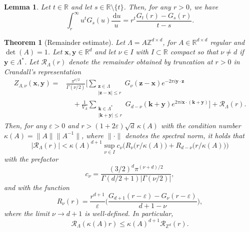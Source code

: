 \documentclass[10pt,a4paper]{amsart}
\newtheorem{lemma}{Lemma}
\newtheorem{theorem}{Theorem}
\renewcommand{\d}{\,\mathrm{d}}
\newcommand{\new}[1]{#1}
\newcommand{\zeps}[3]{\new{Z_{#1} (#2, #3)}}
\begin{document}
\begin{lemma}
\label{lem:g-int-revisited}
Let $t \in \mathds{R}$ and let $s \in \mathds{R} \setminus \{t\}$. Then, for any $r > 0$, we have
\[\int_r^\infty u^{t}G_s(u)\frac{\d u}{u} = r^{t} \frac{G_{t}(r) - G_s(r)}{t-s}.\]
\end{lemma}

\begin{theorem}[Remainder estimate]
  \label{theorem:trunc}
Let $\Lambda=A\mathds Z^{d\times d}$, for $A\in\mathds R^{d\times d}$ regular and $\det(A)=1$. Let $\bm x, \bm y \in \mathds{R}^d$ and let
$\nu\in I$ with $I\subset\mathds R$ compact so that $\nu\neq d$ if $\bm y\in\Lambda^*$.
Let $\mathcal{R}_{\Lambda}(r)$ denote the remainder obtained by truncation at $r>0$ in Crandall's representation
\begin{align*}
\zeps{\Lambda,\nu}{\bm{x}}{\bm{y}}
=&\frac{\pi ^{\nu/2}}{\Gamma(\nu/2)}\Bigg[\sum_{\substack{\bm z\in\Lambda\\ |\bm z - \bm x|\le r}}
G_{\nu}(\bm{z} -\bm x)e^{-2\pi i\bm{y}\cdot\bm{z}}
\\
&
\quad
+\frac{1}{V_{\Lambda}}
\sum_{\substack{\bm k\in\Lambda^{\ast}\\ |\bm k + \bm y|\le r}}G_{d-\nu}
(\bm{k} + \bm y) e^{2\pi i\bm{x}\cdot (\bm{k} + \bm y)}
\Bigg]+\mathcal R_\Lambda(r).
\end{align*}
Then, for any $\varepsilon>0$ and $r>(1+2\varepsilon)\sqrt{d}\,\kappa(A)$ with the condition number $\kappa(A)=\|A\|\|A^{-1}\|$, where $\|\cdot\|$ denotes the spectral norm,
it holds that
$$
|\mathcal R_\Lambda(r)|<\kappa(A)^{d+1} \sup_{\nu \in I}
c_\nu
\Big(
R_{\nu}\big(r/\kappa(A)\big)
+
R_{d-\nu}\big(r/\kappa(A)\big)
\bigg)
$$
with the prefactor \[c_\nu = \frac{(3/2)^d\pi^{(\nu+d)/2}}{\Gamma(d/2+1)|\Gamma(\nu/2)|},\]
and with the function
$$
R_{\nu}(r)
=\frac {r^{d+1}}\varepsilon
\Big(
\frac{G_{d+1}(r-\varepsilon) - 
G_{\nu}(r-\varepsilon)}{d+1-\nu}\Big),
$$
where the limit $\nu\to d+1$ is well-defined.
In particular, 
\[
\mathcal R_\Lambda(\kappa(A)r)
\le \kappa(A)^{d+1}
\mathcal R_{\mathds Z^d}(r).\]
\end{theorem}
\end{document}
